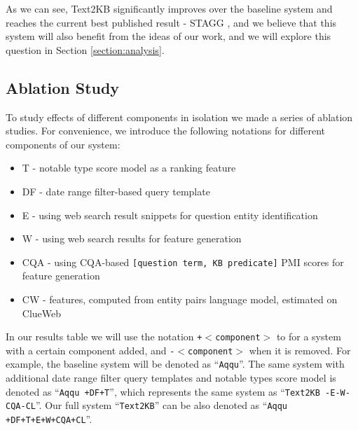 As we can see, Text2KB significantly improves over the baseline system and reaches the current best published result - STAGG \cite{yih2015semantic}, and we believe that this system will also benefit from the ideas of our work, and we will explore this question in Section \ref{section:analysis}.

\subsection{Ablation Study}

To study effects of different components in isolation we made a series of ablation studies.
For convenience, we introduce the following notations for different components of our system:

\begin{itemize}
\setlength\itemsep{-0.5em}
\item T - notable type score model as a ranking feature
\item DF - date range filter-based query template
\item E - using web search result snippets for question entity identification
\item W - using web search results for feature generation
\item CQA - using CQA-based \texttt{[question term, KB predicate]} PMI scores for feature generation
\item CW - features, computed from entity pairs language model, estimated on ClueWeb
\end{itemize}

In our results table we will use the notation \texttt{+$<$component$>$} to for a system with a certain component added, and \texttt{-$<$component$>$} when it is removed.
For example, the baseline system will be denoted as ``\texttt{Aqqu}''.
The same system with additional date range filter query templates and notable types score model is denoted as ``\texttt{Aqqu +DF+T}'', which represents the same system as ``\texttt{Text2KB -E-W-CQA-CL}''.
Our full system ``\texttt{Text2KB}'' can be also denoted as ``\texttt{Aqqu +DF+T+E+W+CQA+CL}''.

